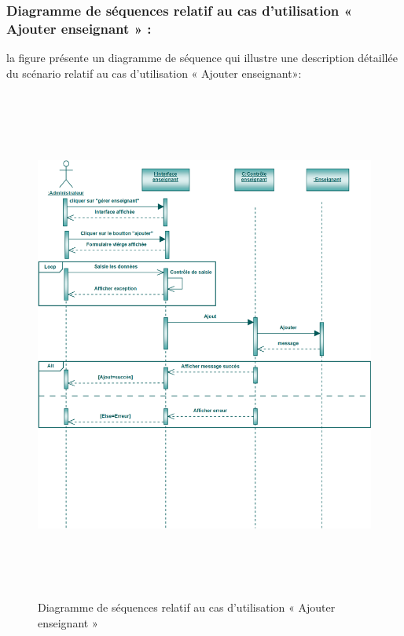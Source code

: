 \documentclass[12 pt]{report}
\begin{document}
\subsubsection{Diagramme de séquences relatif au cas d’utilisation « Ajouter enseignant » :}
la figure   présente un diagramme de séquence qui illustre une description détaillée du scénario relatif au cas d’utilisation « Ajouter enseignant»: 
{\begin{figure}[h]
 \begin{center}
\includegraphics[width= 18 cm ,height=  17cm]{sae.PNG}
\caption{Diagramme de séquences relatif au cas d’utilisation « Ajouter enseignant »}

\end{center}
\end{figure}}
\newpage
\end{document}

